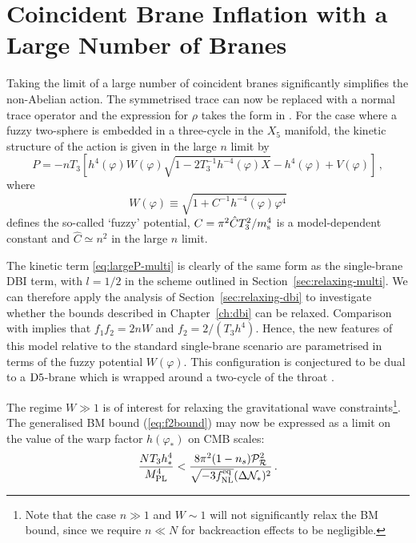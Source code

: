 \section{Coincident Brane Inflation with a Large Number of Branes}
\label{sec:twlargen-multi}
Taking the limit of a large number of coincident branes significantly
simplifies the non-Abelian action. The symmetrised trace can
now be replaced with a normal trace operator and the expression for $\rho$
takes the form in . 
% 
 For the case where a fuzzy two-sphere is 
embedded in a three-cycle in the $X_5$ manifold, 
the kinetic structure of the action is given in the large $n$ limit by 
\cite{thomasward}
% 
\begin{equation}
\label{eq:largeP-multi}
P=-nT_3 \left[ h^4(\varphi ) W(\varphi ) 
\sqrt{1-2 T_3^{-1} h^{-4}(\varphi) X}
-h^4(\varphi ) + V (\varphi ) \right] \,,
\end{equation}
% 
where
%    
\begin{equation} 
\label{eq:defW}
W (\varphi ) \equiv \sqrt{1+ C^{-1}h^{-4}(\varphi ) \varphi^4}
\end{equation}
% 
defines the so-called `fuzzy' potential, 
$C = \pi^2 \hat{C}T_3^2/m_\mathrm{s}^4$ is a model-dependent constant and 
$\hat{C} \simeq n^2$ in the large $n$ limit. 

The kinetic term \eqref{eq:largeP-multi} is clearly of the same form as the
single-brane DBI term, with $l=1/2$ in the scheme outlined in
Section~\ref{sec:relaxing-multi}. We can therefore apply the analysis of
Section~\ref{sec:relaxing-dbi} to investigate whether the bounds described in
Chapter~\ref{ch:dbi} can be relaxed.
Comparison with  
implies that $f_1f_2 =2nW$ and $f_2=2/(T_3h^4)$. Hence, 
the new features of this model relative to the standard single-brane 
scenario are parametrised in terms of the fuzzy potential $W (\varphi )$. 
This configuration is conjectured to be dual to 
a ${\rm D5}$-brane which is wrapped around a two-cycle 
of the throat \cite{dual1,dual2,dual3}. 


The regime $W \gg 1$ is of interest for 
relaxing the gravitational wave constraints\footnote{Note that 
the case $n \gg 1$ and
$W \sim 1$ will not significantly relax the BM bound, 
since we require $n \ll N$ for backreaction effects to be negligible.}. 
The generalised BM bound (\ref{eq:f2bound}) may now be expressed as 
a limit on the value of the warp factor $h(\varphi_*)$ on CMB scales: 
% 
\begin{equation}
\label{eq:warptorelax}
\frac{NT_3h^4_*}{M_{\mathrm{PL}}^4} < 
\frac{8\pi^2 (1-n_s)\mathcal{P}_{\mathcal{R}}^2 }{\sqrt{-3f_{\mathrm{NL}}^{\mathrm{eq}}}(\Delta \mathcal{N}_*)^2} \,.
\end{equation}
% 


